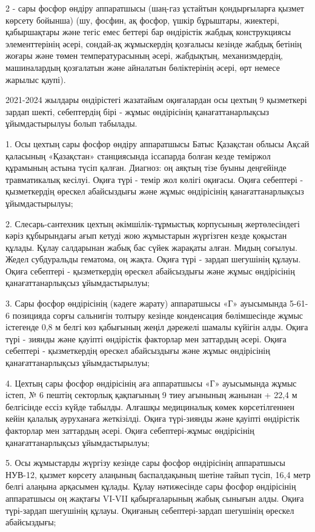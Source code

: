\begin{multicols}{2}
- сары фосфор өндіру аппаратшысы (шаң-газ ұстайтын қондырғыларға қызмет
көрсету бойынша) (шу, фосфин, ақ фосфор, үшкір бұрыштары, жиектері,
қабыршақтары және тегіс емес беттері бар өндірістік жабдық конструкциясы
элементтерінің әсері, сондай-ақ жұмыскердің қозғалысы кезінде жабдық
бетінің жоғары және төмен температурасының әсері, жабдықтың,
механизмдердің, машиналардың қозғалатын және айналатын бөліктерінің
әсері, өрт немесе жарылыс қаупі).

2021-2024 жылдары өндірістегі жазатайым оқиғалардан осы цехтың 9
қызметкері зардап шекті, себептердің бірі - жұмыс өндірісінің
қанағаттанарлықсыз ұйымдастырылуы болып табылады.

1. Осы цехтың сары фосфор өндіру аппаратшысы Батыс Қазақстан облысы
Ақсай қаласының «Қазақстан» станциясында іссапарда болған кезде теміржол
құрамының астына түсіп қалған. Диагноз: оң аяқтың тізе буыны деңгейінде
травматикалық кесілуі. Оқиға түрі - темір жол көлігі оқиғасы. Оқиға
себептері - қызметкердің өрескел абайсыздығы және жұмыс өндірісінің
қанағаттанарлықсыз ұйымдастырылуы;

2. Слесарь-сантехник цехтың әкімшілік-тұрмыстық корпусының
жертөлесіндегі кәріз құбырындағы ағып кетуді жою жұмыстарын жүргізген
кезде қоқыстан құлады. Құлау салдарынан жабық бас сүйек жарақаты алған.
Мидың соғылуы. Жедел субдуральды гематома, оң жақта. Оқиға түрі - зардап
шегушінің құлауы. Оқиға себептері - қызметкердің өрескел абайсыздығы
және жұмыс өндірісінің қанағаттанарлықсыз ұйымдастырылуы;

3. Сары фосфор өндірісінің (кәдеге жарату) аппаратшысы «Г» ауысымында
5-61-6 позицияда сорғы сальнигін толтыру кезінде конденсация
бөлімшесінде жұмыс істегенде 0,8 м белгі көз қабығының жеңіл дәрежелі
шамалы күйігін алды. Оқиға түрі - зиянды және қауіпті өндірістік
факторлар мен заттардың әсері. Оқиға себептері - қызметкердің өрескел
абайсыздығы және жұмыс өндірісінің қанағаттанарлықсыз ұйымдастырылуы;

4. Цехтың сары фосфор өндірісінің аға аппаратшысы «Г» ауысымында жұмыс
істеп, № 6 пештің секторлық қақпағының 9 тиеу ағынының жанынан + 22,4 м
белгісінде ессіз күйде табылды. Алғашқы медициналық көмек көрсетілгеннен
кейін қалалық ауруханаға жеткізілді. Оқиға түрі-зиянды және қауіпті
өндірістік факторлар мен заттардың әсері. Оқиға себептері-жұмыс
өндірісінің қанағаттанарлықсыз ұйымдастырылуы;

5. Осы жұмыстарды жүргізу кезінде сары фосфор өндірісінің аппаратшысы
НУВ-12, қызмет көрсету алаңының баспалдақының шетіне тайып түсіп, 16,4
метр белгі алаңына арқасымен құлады. Құлау нәтижесінде сары фосфор
өндірісінің аппаратшысы оң жақтағы VI-VII қабырғаларының жабық сынығын
алды. Оқиға түрі-зардап шегушінің құлауы. Оқиғаның себептері-зардап
шегушінің өрескел абайсыздығы;


\end{multicols}
